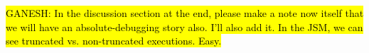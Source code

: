 
\hl{GANESH: In the discussion section at the end, please make a note now itself that we will have an absolute-debugging story also. I'll also add it. In the JSM, we can see truncated vs. non-truncated executions. Easy.}
 
